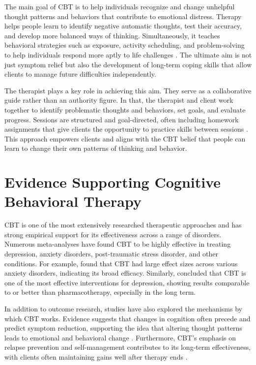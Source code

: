 \documentclass[stu]{apa7}
\begin{document}
The main goal of CBT is to help individuals recognize and change unhelpful thought patterns and behaviors that contribute to emotional distress. Therapy helps people learn to identify negative automatic thoughts, test their accuracy, and develop more balanced ways of thinking. Simultaneously, it teaches behavioral strategies such as exposure, activity scheduling, and problem-solving to help individuals respond more aptly to life challenges \parencite{dobson2018evidence}. The ultimate aim is not just symptom relief but also the development of long-term coping skills that allow clients to manage future difficulties independently.

The therapist plays a key role in achieving this aim. They serve as a collaborative guide rather than an authority figure. In that, the therapist and client work together to identify problematic thoughts and behaviors, set goals, and evaluate progress. Sessions are structured and goal-directed, often including homework assignments that give clients the opportunity to practice skills between sessions \parencite{beck2020cognitive}. This approach empowers clients and aligns with the CBT belief that people can learn to change their own patterns of thinking and behavior.

\section{Evidence Supporting Cognitive Behavioral Therapy}

CBT is one of the most extensively researched therapeutic approaches and has strong empirical support for its effectiveness across a range of disorders. Numerous meta-analyses have found CBT to be highly effective in treating depression, anxiety disorders, post-traumatic stress disorder, and other conditions. For example, \textcite{hofmann2012efficacy} found that CBT had large effect sizes across various anxiety disorders, indicating its broad efficacy. Similarly, \textcite{cuijpers2008psychotherapy} concluded that CBT is one of the most effective interventions for depression, showing results comparable to or better than pharmacotherapy, especially in the long term.

In addition to outcome research, studies have also explored the mechanisms by which CBT works. Evidence suggests that changes in cognition often precede and predict symptom reduction, supporting the idea that altering thought patterns leads to emotional and behavioral change \parencite{stober2001worry}. Furthermore, CBT’s emphasis on relapse prevention and self-management contributes to its long-term effectiveness, with clients often maintaining gains well after therapy ends \parencite{hollon2006enduring}.
\end{document}
